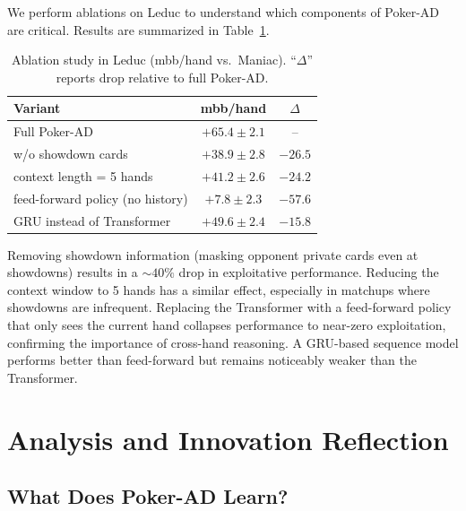 \documentclass{article}
\begin{document}
We perform ablations on Leduc to understand which components of Poker-AD are critical. Results are summarized in Table~\ref{tab:ablation}.

\begin{table}[t]
    \centering
    \caption{Ablation study in Leduc (mbb/hand vs.\ Maniac). ``$\Delta$'' reports drop relative to full Poker-AD.}
    \label{tab:ablation}
    \begin{tabular}{lcc}
        \toprule
        Variant & mbb/hand & $\Delta$ \\
        \midrule
        Full Poker-AD & $+65.4 \pm 2.1$ & -- \\
        \quad w/o showdown cards & $+38.9 \pm 2.8$ & $-26.5$ \\
        \quad context length = 5 hands & $+41.2 \pm 2.6$ & $-24.2$ \\
        \quad feed-forward policy (no history) & $+7.8 \pm 2.3$ & $-57.6$ \\
        \quad GRU instead of Transformer & $+49.6 \pm 2.4$ & $-15.8$ \\
        \bottomrule
    \end{tabular}
\end{table}

Removing showdown information (masking opponent private cards even at showdowns) results in a $\sim 40\%$ drop in exploitative performance. Reducing the context window to 5 hands has a similar effect, especially in matchups where showdowns are infrequent. Replacing the Transformer with a feed-forward policy that only sees the current hand collapses performance to near-zero exploitation, confirming the importance of cross-hand reasoning. A GRU-based sequence model performs better than feed-forward but remains noticeably weaker than the Transformer.

\section{Analysis and Innovation Reflection}
\label{sec:analysis}

\subsection{What Does Poker-AD Learn?}
\end{document}
